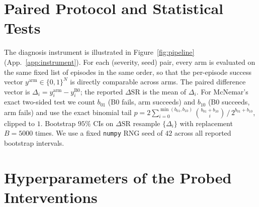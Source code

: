 \section{Paired Protocol and Statistical Tests}
\label{app:protocol}

The diagnosis instrument is illustrated in Figure~\ref{fig:pipeline}
(App.~\ref{app:instrument}). For each (severity, seed) pair, every arm is evaluated on the same fixed
list of episodes in the same order, so that the per-episode success vector
$y^{\text{arm}}\in\{0,1\}^N$ is directly comparable across arms. The paired
difference vector is $\Delta_i = y^{\text{arm}}_i - y^{\text{B0}}_i$; the
reported $\Delta\text{SR}$ is the mean of $\Delta_i$. For McNemar's exact
two-sided test we count $b_{01}$ (B0 fails, arm succeeds) and $b_{10}$ (B0
succeeds, arm fails) and use the exact binomial tail
$p = 2\sum_{i=0}^{\min(b_{01},b_{10})} \binom{b_{01}+b_{10}}{i}\,/\,2^{b_{01}+b_{10}}$,
clipped to $1$. Bootstrap $95\%$ CIs on $\Delta\text{SR}$ resample
$\{\Delta_i\}$ with replacement $B{=}5000$ times. We use a fixed
\texttt{numpy} RNG seed of $42$ across all reported bootstrap intervals.

\section{Hyperparameters of the Probed Interventions}
\label{app:hp}

